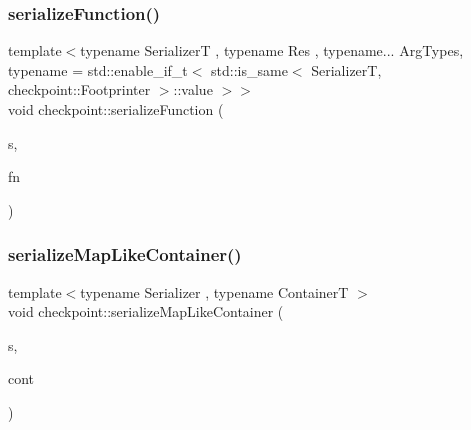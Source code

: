 \mbox{\label{namespacecheckpoint_a4161978e6d6de385d942cbcbe659817a}} 
\subsubsection{\texorpdfstring{serialize\+Function()}{serializeFunction()}}
{\footnotesize\ttfamily template$<$typename SerializerT , typename Res , typename... Arg\+Types, typename  = std\+::enable\+\_\+if\+\_\+t$<$    std\+::is\+\_\+same$<$      Serializer\+T,      checkpoint\+::\+Footprinter    $>$\+::value  $>$$>$ \\
void checkpoint\+::serialize\+Function (\begin{DoxyParamCaption}\item[{SerializerT \&}]{s,  }\item[{std\+::function$<$ Res(Arg\+Types...)$>$ \&}]{fn }\end{DoxyParamCaption})}

\mbox{\label{namespacecheckpoint_a99092baac18b33d03b1bb47ed1f2d7fa}} 
\subsubsection{\texorpdfstring{serialize\+Map\+Like\+Container()}{serializeMapLikeContainer()}}
{\footnotesize\ttfamily template$<$typename Serializer , typename ContainerT $>$ \\
void checkpoint\+::serialize\+Map\+Like\+Container (\begin{DoxyParamCaption}\item[{\hyperlink{structcheckpoint_1_1_serializer}{Serializer} \&}]{s,  }\item[{ContainerT \&}]{cont }\end{DoxyParamCaption})\hspace{0.3cm}{\ttfamily [inline]}}

\mbox{\label{namespacecheckpoint_a0b15edc50a881e06260e7112b2c60742}} 
